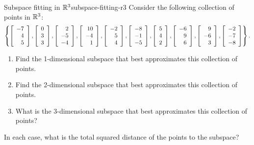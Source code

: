 \documentclass{ximera}
\begin{document}
\begin{example}{Subspace fitting in $\R^3$}{subspace-fitting-r3}
  Consider the following collection of points in $\R^3$:
  \begin{equation*}
    \set{
      \startmat{r} -7 \\ 4 \\ 5 \stopmat,
      \startmat{r} 0 \\ 3 \\ 3 \stopmat,
      \startmat{r} 2 \\ -5 \\ -4 \stopmat,
      \startmat{r} 10 \\ -4 \\ 1 \stopmat,
      \startmat{r} -2 \\ 5 \\ 4 \stopmat,
      \startmat{r} -8 \\ -1 \\ -5 \stopmat,
      \startmat{r} 5 \\ 4 \\ 2 \stopmat,
      \startmat{r} -6 \\ 9 \\ 6 \stopmat,
      \startmat{r} 9 \\ -6 \\ 3 \stopmat,
      \startmat{r} -2 \\ -7 \\ -8 \stopmat
    }.
  \end{equation*}
    \begin{enumerate}
    \item Find the 1-dimensional subspace that best approximates this
      collection of points.
    \item Find the 2-dimensional subspace that best approximates this
      collection of points.
    \item What is the 3-dimensional subspace that best approximates this
      collection of points?
    \end{enumerate}
  In each case, what is the total squared distance of the points to
  the subspace?
\end{example}
\end{document}

